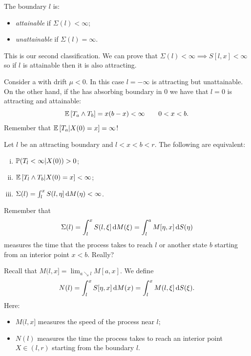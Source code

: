 \documentclass[12pt]{report}
\begin{document}
\begin{definition}
	The boundary $l$ is:
	\begin{itemize}
		\item \emph{attainable} if $\Sigma(l)<\infty$;
		\item \emph{unattainable} if $\Sigma(l)=\infty$.
	\end{itemize}
\end{definition}
This is our second classification. We can prove that $\Sigma(l)<\infty\implies S[l,x]<\infty$ so if $l$ is attainable then it is also attracting.\par
Consider a \bwm{} with drift $\mu<0$. In this case $l=-\infty$ is attracting but unattainable. On the other hand, if the \bwm{} has absorbing boundary in 0 we have that $l=0$ is attracting and attainable:
\begin{equation*}
	\mathbb{E}\left[T_{a}\wedge T_{b}\right]=x(b-x)<\infty\qquad0<x<b.
\end{equation*}
Remember that $\mathbb{E}\left[T_{a}|X(0)=x\right]=\infty$!
\begin{lemma}
	Let $l$ be an attracting boundary and $l<x<b<r$. The following are equivalent:
	\begin{enumerate}[i)]
		\item $\mathbb{P}(T_{l}<\infty|X(0))>0$;
		\item $\mathbb{E}\left[T_{l}\wedge T_{b}|X(0)=x\right]<\infty$;
		\item $\Sigma(l)=\int_{l}^{x}S(l,\eta]\mathop{}\!\mathrm{d} M(\eta)<\infty$. 
	\end{enumerate}
\end{lemma}
Remember that 
\begin{equation*}
	\Sigma(l)=\int_{l}^{x}S(l,\xi]\mathop{}\!\mathrm{d} M(\xi)=\int_{l}^{a}M[\eta,x]\mathop{}\!\mathrm{d} S(\eta)
\end{equation*}
measures the time that the process takes to reach $l$ or another state $b$ starting from an interior point $x<b$. Really?
\begin{definition}
	Recall that $M(l,x]=\lim_{a\searrow l}M[a,x]$. We define
	\begin{equation*}
		N(l)=\int_{l}^{x}S[\eta,x]\mathop{}\!\mathrm{d} M(x)=\int_{l}^{x}M(l,\xi]\mathop{}\!\mathrm{d} S(\xi).
	\end{equation*}
	Here:
	\begin{itemize}
		\item $M(l,x]$ measures the speed of the process near $l$;
		\item $N(l)$ measures the time the process takes to reach an interior point $X\in(l,r)$ starting from the boundary $l$.
	\end{itemize}
\end{definition}
\end{document}
